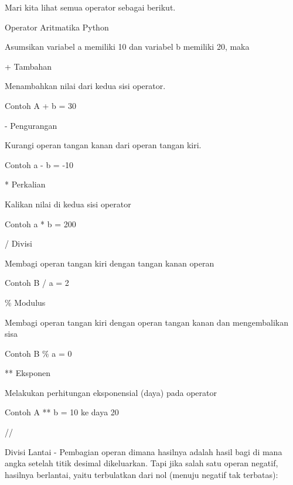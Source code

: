 Mari kita lihat semua operator sebagai berikut. \par
\vspace{12pt}
\noindent
Operator Aritmatika Python \par
\vspace{12pt}
\noindent
Asumsikan variabel a memiliki 10 dan variabel b memiliki 20, maka  \par
\vspace{12pt}
\noindent
+ Tambahan \par
\noindent
Menambahkan nilai dari kedua sisi operator. \par
\noindent
Contoh A + b = 30 \par
\vspace{12pt}
\noindent
- Pengurangan \par
\noindent
Kurangi operan tangan kanan dari operan tangan kiri. \par
\noindent
Contoh a - b = -10 \par
\vspace{12pt}
\noindent
* Perkalian \par
\noindent
Kalikan nilai di kedua sisi operator \par
\noindent
Contoh a * b = 200 \par
\vspace{12pt}
\noindent
/ Divisi \par
\noindent
Membagi operan tangan kiri dengan tangan kanan operan \par
\noindent
Contoh B / a = 2 \par
\vspace{12pt}
\noindent
 $  \%  $ Modulus \par
\noindent
Membagi operan tangan kiri dengan operan tangan kanan dan mengembalikan sisa \par
\noindent
Contoh B $  \%  $ a = 0 \par
\vspace{12pt}
\noindent
** Eksponen \par
\noindent
Melakukan perhitungan eksponensial (daya) pada operator \par
\noindent
Contoh A ** b = 10 ke daya 20 \par
\vspace{12pt}
\noindent
// \par
\vspace{12pt}
\noindent
Divisi Lantai - Pembagian operan dimana hasilnya adalah hasil bagi di mana angka setelah titik desimal dikeluarkan. $  $Tapi jika salah satu operan negatif, hasilnya berlantai, yaitu terbulatkan dari nol (menuju negatif tak terbatas): \par
